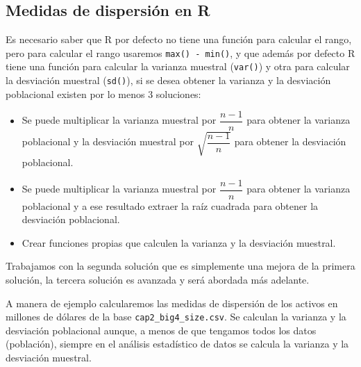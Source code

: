 \documentclass[
]{krantz}
\providecommand{\tightlist}{%
  \setlength{\itemsep}{0pt}\setlength{\parskip}{0pt}}
\begin{document}
\hypertarget{medidas-de-dispersion-en-r}{%
\subsection{Medidas de dispersión en R}\label{medidas-de-dispersion-en-r}}

Es necesario saber que R por defecto no tiene una función para calcular el rango, pero para calcular el rango usaremos \texttt{max()\ -\ min()}, y que además por defecto R tiene una función para calcular la varianza muestral (\texttt{var()}) y otra para calcular la desviación muestral (\texttt{sd()}), si se desea obtener la varianza y la desviación poblacional existen por lo menos 3 soluciones:

\begin{itemize}
\tightlist
\item
  Se puede multiplicar la varianza muestral por \(\dfrac{n-1}{n}\) para obtener la varianza poblacional y la desviación muestral por \(\sqrt{\dfrac{n-1}{n}}\) para obtener la desviación poblacional.
\item
  Se puede multiplicar la varianza muestral por \(\dfrac{n-1}{n}\) para obtener la varianza poblacional y a ese resultado extraer la raíz cuadrada para obtener la desviación poblacional.
\item
  Crear funciones propias que calculen la varianza y la desviación muestral.
\end{itemize}

Trabajamos con la segunda solución que es simplemente una mejora de la primera solución, la tercera solución es avanzada y será abordada más adelante.

A manera de ejemplo calcularemos las medidas de dispersión de los activos en millones de dólares de la base \texttt{cap2\_big4\_size.csv}. Se calculan la varianza y la desviación poblacional aunque, a menos de que tengamos todos los datos (población), siempre en el análisis estadístico de datos se calcula la varianza y la desviación muestral.
\end{document}
